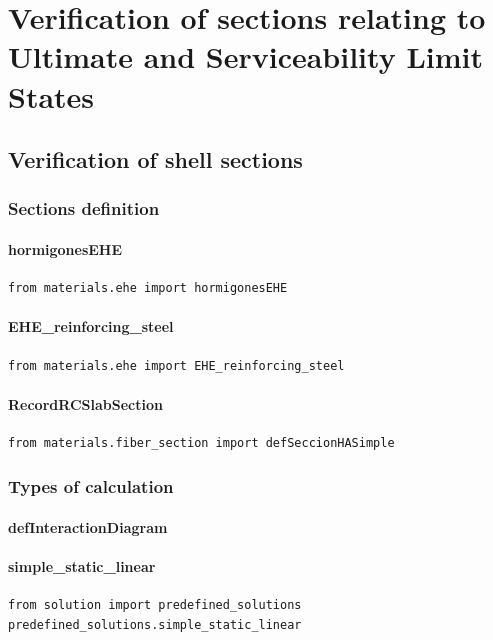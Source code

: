 \chapter{Verification of sections relating to Ultimate and Serviceability Limit States}
\section{Verification of shell sections}
\subsection{Sections definition}
\subsubsection{hormigonesEHE}
\begin{verbatim}
from materials.ehe import hormigonesEHE
\end{verbatim}

\subsubsection{EHE\_reinforcing\_steel}
\begin{verbatim}
from materials.ehe import EHE_reinforcing_steel
\end{verbatim}

\subsubsection{RecordRCSlabSection}
\begin{verbatim}
from materials.fiber_section import defSeccionHASimple
\end{verbatim}


\subsection{Types of calculation}
\subsubsection{defInteractionDiagram}

\subsubsection{simple\_static\_linear}
\begin{verbatim}
from solution import predefined_solutions
predefined_solutions.simple_static_linear
\end{verbatim}

